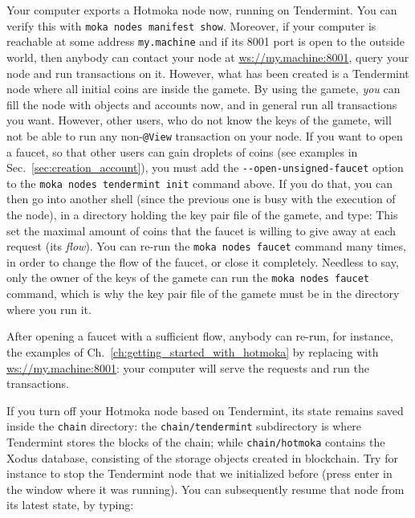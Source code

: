 Your computer exports a Hotmoka node now, running on Tendermint. You can verify this with
\texttt{moka nodes manifest show}.
Moreover, if your computer is reachable at some address \texttt{my.machine}
and if its 8001 port is open to the outside world,
then anybody can contact
your node at \url{ws://my.machine:8001}, query your node and run transactions on it.
However, what has been created is a Tendermint node where all initial coins are inside
the gamete. By using the gamete, \emph{you} can fill the node with objects
and accounts now, and in general run all transactions you want.
However, other users, who do not know the keys of the gamete,
will not be able to run any non-\texttt{@View} transaction on your node.
If you want to open a faucet, so that other users can gain droplets of coins
(see examples in Sec.~\ref{sec:creation_account}),
you must add the \texttt{-{}-open-unsigned-faucet} option to the \texttt{moka nodes tendermint init}
command above. If you do that, you can then go into another shell (since the previous one is busy with the
execution of the node), in a directory holding the key pair file of the gamete, and type:
%
%
This set the maximal amount of coins that
the faucet is willing to give away at each request (its \emph{flow}). You can re-run the
\texttt{moka nodes faucet}
command many times, in order to change the flow of the faucet, or close it completely.
Needless to say, only the owner of the keys of the gamete can run the \texttt{moka nodes faucet} command,
which is why the key pair file of the gamete must be in the directory where you run it.

After opening a faucet with a sufficient flow, anybody can
re-run, for instance, the examples of Ch.~\ref{ch:getting_started_with_hotmoka} by replacing
\serverMokamint{} with \url{ws://my.machine:8001}: your computer will serve
the requests and run the transactions.

If you turn off your Hotmoka node based on Tendermint, its state remains saved inside the
\texttt{chain} directory: the \texttt{chain/tendermint} subdirectory is where Tendermint stores the blocks
of the chain; while \texttt{chain/hotmoka} contains the Xodus database,
consisting of the storage objects created in blockchain.
Try for instance to stop the Tendermint node that we initialized before
(press enter in the window where it was running).
You can subsequently resume that node from its latest state, by typing:
%

